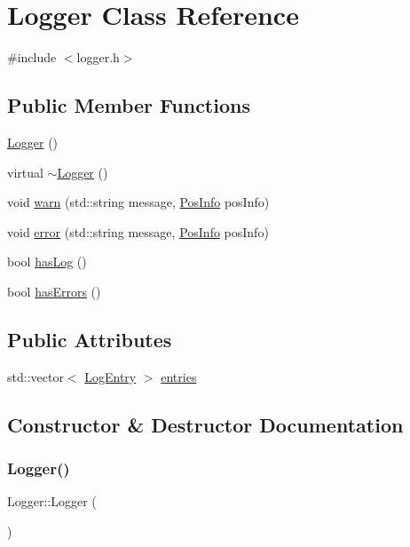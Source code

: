 \hypertarget{classLogger}{}\section{Logger Class Reference}
\label{classLogger}


{\ttfamily \#include $<$logger.\+h$>$}

\subsection*{Public Member Functions}
\begin{DoxyCompactItemize}
\item 
\hyperlink{classLogger_abc41bfb031d896170c7675fa96a6b30c}{Logger} ()
\item 
virtual \hyperlink{classLogger_ae93f62ca3e47716b7120acb032a260f3}{$\sim$\+Logger} ()
\item 
void \hyperlink{classLogger_a31d66ebf52bace306ed8a8f0e0b1f516}{warn} (std\+::string message, \hyperlink{classPosInfo}{Pos\+Info} pos\+Info)
\item 
void \hyperlink{classLogger_a63306c62d25e4d514e8485a9566dde22}{error} (std\+::string message, \hyperlink{classPosInfo}{Pos\+Info} pos\+Info)
\item 
bool \hyperlink{classLogger_a261361c60868c98ab4ea4e562842da1f}{has\+Log} ()
\item 
bool \hyperlink{classLogger_a0a52b10db87dc64e9cb8c991162463f9}{has\+Errors} ()
\end{DoxyCompactItemize}
\subsection*{Public Attributes}
\begin{DoxyCompactItemize}
\item 
std\+::vector$<$ \hyperlink{classLogEntry}{Log\+Entry} $>$ \hyperlink{classLogger_a151c8e1606c22b796aa5ed817a1b5a54}{entries}
\end{DoxyCompactItemize}


\subsection{Constructor \& Destructor Documentation}
\mbox{\label{classLogger_abc41bfb031d896170c7675fa96a6b30c}} 
\subsubsection{\texorpdfstring{Logger()}{Logger()}}
{\footnotesize\ttfamily Logger\+::\+Logger (\begin{DoxyParamCaption}{ }\end{DoxyParamCaption})}


